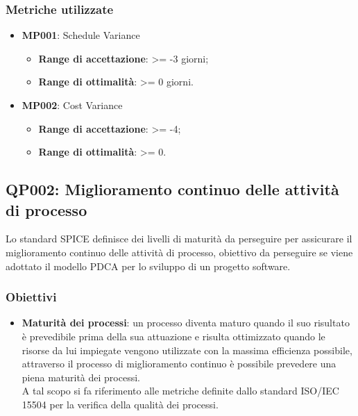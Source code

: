 \subsubsection{Metriche utilizzate}
\begin{itemize}
	\item \textbf{MP001}: Schedule Variance
	\begin{itemize}
		\item \textbf{Range di accettazione}: >= -3 giorni;
		\item \textbf{Range di ottimalità}: >= 0 giorni.
	\end{itemize}
	\item \textbf{MP002}: Cost Variance
	\begin{itemize}
		\item \textbf{Range di accettazione}: >= -4;
		\item \textbf{Range di ottimalità}: >= 0.
	\end{itemize}
\end{itemize}


\subsection{QP002: Miglioramento continuo delle attività di processo}\label{pro2}
Lo standard SPICE definisce dei livelli di maturità da perseguire per assicurare il miglioramento continuo delle attività di processo, obiettivo da perseguire se viene adottato il modello PDCA per lo sviluppo di un progetto software.
\subsubsection{Obiettivi}
\begin{itemize}
	\item \textbf{Maturità dei processi}: un processo diventa maturo quando il suo risultato è prevedibile prima della sua attuazione e risulta ottimizzato quando le risorse da lui impiegate vengono utilizzate con la massima efficienza possibile, attraverso il processo di miglioramento continuo è possibile prevedere una piena maturità dei processi.\\
	A tal scopo si fa riferimento alle metriche definite dallo standard ISO/IEC 15504 per la verifica della qualità dei processi.
\end{itemize}

